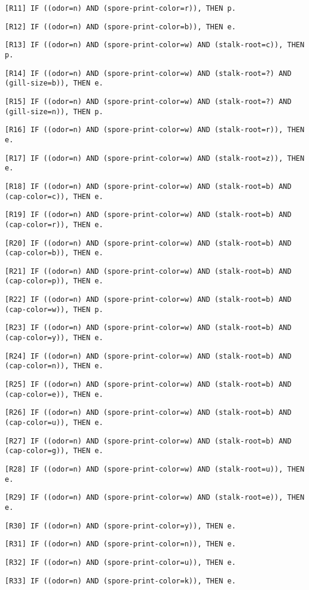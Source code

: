 \documentclass{IEEEtran}
\begin{document}
\texttt{[R11] IF ((odor=n) AND (spore-print-color=r)), THEN p.}

\texttt{[R12] IF ((odor=n) AND (spore-print-color=b)), THEN e.}

\texttt{[R13] IF ((odor=n) AND (spore-print-color=w) AND
  (stalk-root=c)), THEN p.}

\texttt{[R14] IF ((odor=n) AND (spore-print-color=w) AND (stalk-root=?)
  AND (gill-size=b)), THEN e.}

\texttt{[R15] IF ((odor=n) AND (spore-print-color=w) AND (stalk-root=?)
  AND (gill-size=n)), THEN p.}

\texttt{[R16] IF ((odor=n) AND (spore-print-color=w) AND
  (stalk-root=r)), THEN e.}

\texttt{[R17] IF ((odor=n) AND (spore-print-color=w) AND (stalk-root=z)), THEN
e.}

\texttt{[R18] IF ((odor=n) AND (spore-print-color=w) AND (stalk-root=b) AND
(cap-color=c)), THEN e.}

\texttt{[R19] IF ((odor=n) AND (spore-print-color=w) AND (stalk-root=b) AND
(cap-color=r)), THEN e.}

\texttt{[R20] IF ((odor=n) AND (spore-print-color=w) AND (stalk-root=b) AND
(cap-color=b)), THEN e.}

\texttt{[R21] IF ((odor=n) AND (spore-print-color=w) AND (stalk-root=b) AND
(cap-color=p)), THEN e.}

\texttt{[R22] IF ((odor=n) AND (spore-print-color=w) AND (stalk-root=b) AND
(cap-color=w)), THEN p.}

\texttt{[R23] IF ((odor=n) AND (spore-print-color=w) AND (stalk-root=b) AND
(cap-color=y)), THEN e.}

\texttt{[R24] IF ((odor=n) AND (spore-print-color=w) AND (stalk-root=b) AND
(cap-color=n)), THEN e.}

\texttt{[R25] IF ((odor=n) AND (spore-print-color=w) AND (stalk-root=b) AND
(cap-color=e)), THEN e.}

\texttt{[R26] IF ((odor=n) AND (spore-print-color=w) AND (stalk-root=b) AND
(cap-color=u)), THEN e.}

\texttt{[R27] IF ((odor=n) AND (spore-print-color=w) AND (stalk-root=b) AND
(cap-color=g)), THEN e.}

\texttt{[R28] IF ((odor=n) AND (spore-print-color=w) AND (stalk-root=u)), THEN
e.}

\texttt{[R29] IF ((odor=n) AND (spore-print-color=w) AND (stalk-root=e)), THEN
e.}

\texttt{[R30] IF ((odor=n) AND (spore-print-color=y)), THEN e.}

\texttt{[R31] IF ((odor=n) AND (spore-print-color=n)), THEN e.}

\texttt{[R32] IF ((odor=n) AND (spore-print-color=u)), THEN e.}

\texttt{[R33] IF ((odor=n) AND (spore-print-color=k)), THEN e.}
\end{document}
